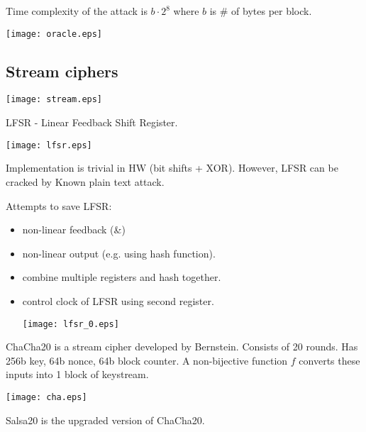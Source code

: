 Time complexity of the attack is $b \cdot 2^8$ where $b$ is \# of bytes per block.

	\texttt{[image: oracle.eps]}

\subsection{Stream ciphers}

	\texttt{[image: stream.eps]}

\begin{example}
	LFSR - Linear Feedback Shift Register.

	\texttt{[image: lfsr.eps]}

	Implementation is trivial in HW (bit shifts + XOR). However, LFSR can be cracked by Known plain text attack.
\end{example}

Attempts to save LFSR:
\begin{itemize}
	\item non-linear feedback (\&)
	\item non-linear output (e.g. using hash function).
	\item combine multiple registers and hash together.
	\item control clock of LFSR using second register.

	\texttt{[image: lfsr\_0.eps]}
\end{itemize}

\begin{example}
	ChaCha20 is a stream cipher developed by Bernstein. Consists of 20 rounds.
	Has 256b key, 64b nonce, 64b block counter. A non-bijective function $f$ converts these inputs into 1 block of keystream.

	\texttt{[image: cha.eps]}

	Salsa20 is the upgraded version of ChaCha20.
\end{example}
